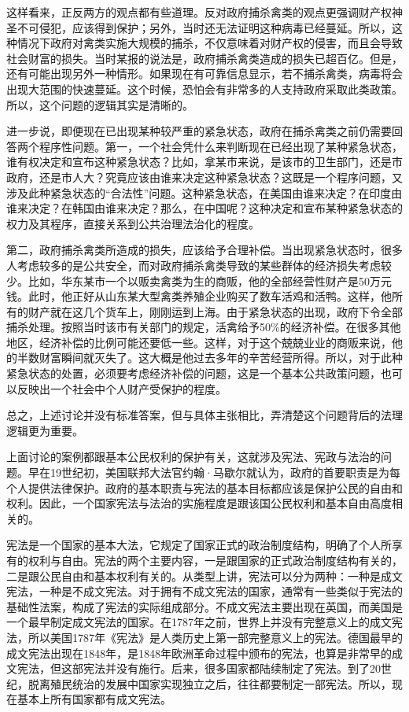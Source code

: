 这样看来，正反两方的观点都有些道理。反对政府捕杀禽类的观点更强调财产权神圣不可侵犯，应该得到保护；另外，当时还无法证明这种病毒已经蔓延。所以，这种情况下政府对禽类实施大规模的捕杀，不仅意味着对财产权的侵害，而且会导致社会财富的损失。当时某报的说法是，政府捕杀禽类造成的损失已超百亿。但是，还有可能出现另外一种情形。如果现在有可靠信息显示，若不捕杀禽类，病毒将会出现大范围的快速蔓延。这个时候，恐怕会有非常多的人支持政府采取此类政策。所以，这个问题的逻辑其实是清晰的。

进一步说，即便现在已出现某种较严重的紧急状态，政府在捕杀禽类之前仍需要回答两个程序性问题。第一，一个社会凭什么来判断现在已经出现了某种紧急状态，谁有权决定和宣布这种紧急状态？比如，拿某市来说，是该市的卫生部门，还是市政府，还是市人大？究竟应该由谁来决定这种紧急状态？这既是一个程序问题，又涉及此种紧急状态的“合法性”问题。这种紧急状态，在美国由谁来决定？在印度由谁来决定？在韩国由谁来决定？那么，在中国呢？这种决定和宣布某种紧急状态的权力及其程序，直接关系到公共治理法治化的程度。

第二，政府捕杀禽类所造成的损失，应该给予合理补偿。当出现紧急状态时，很多人考虑较多的是公共安全，而对政府捕杀禽类导致的某些群体的经济损失考虑较少。比如，华东某市一个以贩卖禽类为生的商贩，他的全部经营性财产是50万元钱。此时，他正好从山东某大型禽类养殖企业购买了数车活鸡和活鸭。这样，他所有的财产就在这几个货车上，刚刚运到上海。由于紧急状态的出现，政府下令全部捕杀处理。按照当时该市有关部门的规定，活禽给予50\%的经济补偿。在很多其他地区，经济补偿的比例可能还要低一些。这样，对于这个兢兢业业的商贩来说，他的半数财富瞬间就灭失了。这大概是他过去多年的辛苦经营所得。所以，对于此种紧急状态的处置，必须要考虑经济补偿的问题，这是一个基本公共政策问题，也可以反映出一个社会中个人财产受保护的程度。

总之，上述讨论并没有标准答案，但与具体主张相比，弄清楚这个问题背后的法理逻辑更为重要。


上面讨论的案例都跟基本公民权利的保护有关，这就涉及宪法、宪政与法治的问题。早在19世纪初，美国联邦大法官约翰·马歇尔就认为，政府的首要职责是为每个人提供法律保护。政府的基本职责与宪法的基本目标都应该是保护公民的自由和权利。因此，一个国家宪法与法治的实施程度是跟该国公民权利和基本自由高度相关的。

宪法是一个国家的基本大法，它规定了国家正式的政治制度结构，明确了个人所享有的权利与自由。宪法的两个主要内容，一是跟国家的正式政治制度结构有关的，二是跟公民自由和基本权利有关的。从类型上讲，宪法可以分为两种：一种是成文宪法，一种是不成文宪法。对于拥有不成文宪法的国家，通常有一些类似于宪法的基础性法案，构成了宪法的实际组成部分。不成文宪法主要出现在英国，而美国是一个最早制定成文宪法的国家。在1787年之前，世界上并没有完整意义上的成文宪法，所以美国1787年《宪法》是人类历史上第一部完整意义上的宪法。德国最早的成文宪法出现在1848年，是1848年欧洲革命过程中颁布的宪法，也算是非常早的成文宪法，但这部宪法并没有施行。后来，很多国家都陆续制定了宪法。到了20世纪，脱离殖民统治的发展中国家实现独立之后，往往都要制定一部宪法。所以，现在基本上所有国家都有成文宪法。

